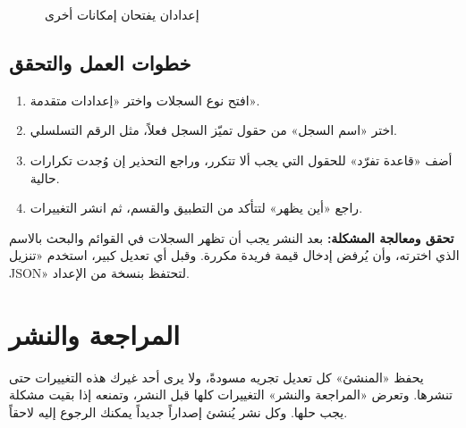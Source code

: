 \begin{figure}[H]
\centering
{}
\rclegend
\caption{إعدادان يفتحان إمكانات أخرى}
\label{fig:builder-advanced-effects}
\end{figure}

\subsection{خطوات العمل والتحقق}
\begin{enumerate}
\item افتح نوع السجلات واختر «إعدادات متقدمة».
\item اختر «اسم السجل» من حقول تميّز السجل فعلاً، مثل الرقم التسلسلي.
\item أضف «قاعدة تفرّد» للحقول التي يجب ألا تتكرر، وراجع التحذير إن وُجدت تكرارات حالية.
\item راجع «أين يظهر» لتتأكد من التطبيق والقسم، ثم انشر التغييرات.
\end{enumerate}

\textbf{تحقق ومعالجة المشكلة:} بعد النشر يجب أن تظهر السجلات في القوائم والبحث بالاسم الذي اخترته، وأن يُرفض إدخال قيمة فريدة مكررة. وقبل أي تعديل كبير، استخدم «تنزيل JSON» لتحتفظ بنسخة من الإعداد.

\clearpage
\section{المراجعة والنشر}
\label{sec:builder-feature-publish}

يحفظ «المنشئ» كل تعديل تجريه مسودةً، ولا يرى أحد غيرك هذه التغييرات حتى تنشرها. وتعرض «المراجعة والنشر» التغييرات كلها قبل النشر، وتمنعه إذا بقيت مشكلة يجب حلها. وكل نشر يُنشئ إصداراً جديداً يمكنك الرجوع إليه لاحقاً.

